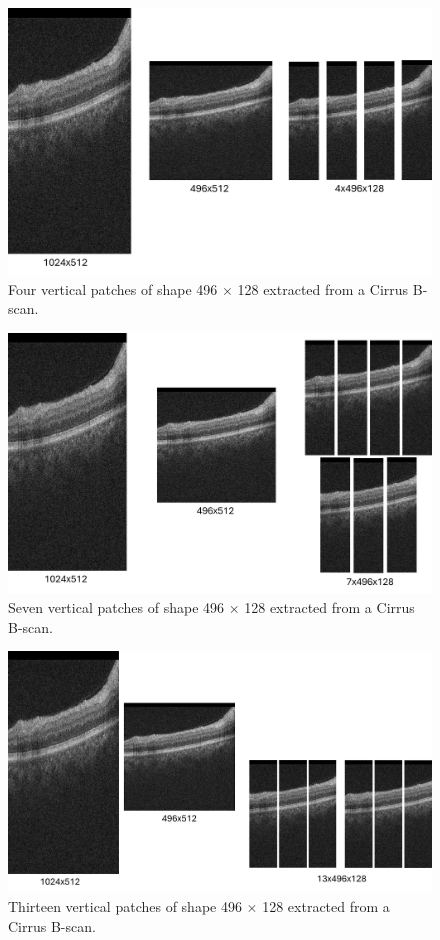 \begin{figure}[!ht]
	\centering
	\includegraphics[width=0.65\linewidth]{figures/CirrusFourPatchExtraction.png}
	\caption{Four vertical patches of shape 496 $\times$ 128 extracted from a Cirrus B-scan.}
	\label{fig:CirrusFourPatchExtraction}
\end{figure}

\begin{figure}[!ht]
	\centering
	\includegraphics[width=0.65\linewidth]{figures/CirrusSevenPatchExtraction.png}
	\caption{Seven vertical patches of shape 496 $\times$ 128 extracted from a Cirrus B-scan.}
	\label{fig:CirrusSevenPatchExtraction}
\end{figure}


\begin{figure}[!ht]
	\centering
	\includegraphics[width=0.75\linewidth]{figures/CirrusThirteenPatchExtraction.png}
	\caption{Thirteen vertical patches of shape 496 $\times$ 128 extracted from a Cirrus B-scan.}
	\label{fig:CirrusThirteenPatchExtraction}
\end{figure}

